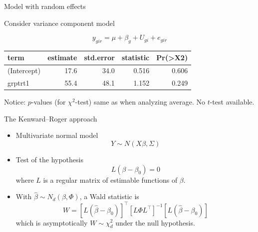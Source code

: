 \documentclass[
  ignorenonframetext,
]{beamer}
\def\bm{ }
\newcommand{\betab}{\bm{\beta}}
\newcommand{\Lb}{L}
\newcommand{\transp}{^{\top}}
\newcommand{\inv}{^{-1}}
\begin{document}
\begin{frame}

\begin{block}{Model with random effects}

Consider variance component model

\[
y_{gir} = \mu + \beta_g + U_{gi} + e_{gir}
\]

\small

\begin{table}[!h]
\centering
\begin{tabular}{lrrrr}
\toprule
term & estimate & std.error & statistic & Pr(>X2)\\
\midrule
(Intercept) & 17.6 & 34.0 & 0.516 & 0.606\\
grptrt1 & 55.4 & 48.1 & 1.152 & 0.249\\
\bottomrule
\end{tabular}
\end{table}

\normalsize

Notice: \(p\)-values (for \(\chi^2\)-test) same as when analyzing
average. No \(t\)-test available.

\end{block}

\end{frame}

\begin{frame}

\begin{block}{The Kenward--Roger approach}

\begin{itemize}
\item
  Multivariate normal model \[
  Y \sim  N( X \beta, \Sigma)
  \]
\item
  Test of the hypothesis \[
  \Lb (\betab -\bm \beta_0) = 0
  \] where \(\Lb\) is a regular matrix of estimable functions of
  \(\bm \beta\).
\item
  With \(\hat \betab \sim N_d(\betab, \bm\Phi)\), a Wald statistic is \[
  W = [\Lb(\hat\betab - \betab_0)]\transp [L\bm\Phi L\transp]\inv [\Lb(\hat\betab - \betab_0)]
  \] which is asymptotically \(W \sim \chi^2_d\) under the null
  hypothesis.
\end{itemize}

\end{block}

\end{frame}
\end{document}
